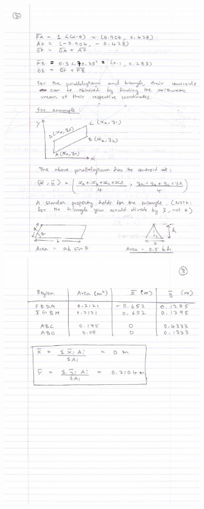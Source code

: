 {\begin{figure}[ht!]
  \includegraphics[width=0.9\textwidth,
	           height=0.3\textheight,
		   keepaspectratio]{solnb.png}
  \includegraphics[width=0.9\textwidth,
	           height=0.3\textheight,
		   keepaspectratio]{solnc.png}
\end{figure}
}{%
}%
